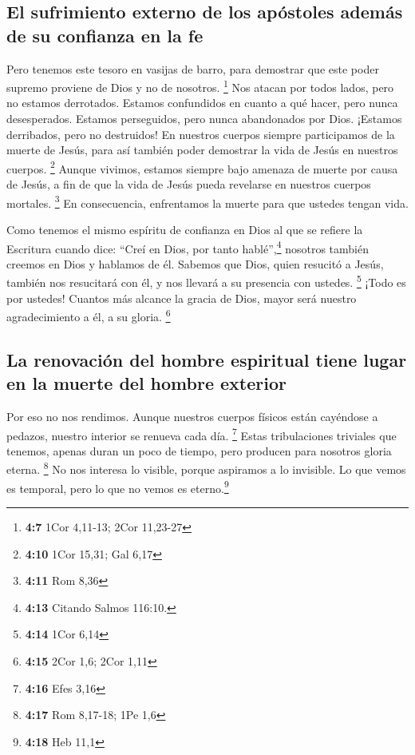 \hypertarget{el-sufrimiento-externo-de-los-apuxf3stoles-ademuxe1s-de-su-confianza-en-la-fe}{%
\subsection{El sufrimiento externo de los apóstoles además de su
confianza en la
fe}\label{el-sufrimiento-externo-de-los-apuxf3stoles-ademuxe1s-de-su-confianza-en-la-fe}}

 Pero tenemos este tesoro en vasijas de barro, para
demostrar que este poder supremo proviene de Dios y no de nosotros.
\footnote{\textbf{4:7} 1Cor 4,11-13; 2Cor 11,23-27}  Nos
atacan por todos lados, pero no estamos derrotados. Estamos confundidos
en cuanto a qué hacer, pero nunca desesperados.  Estamos
perseguidos, pero nunca abandonados por Dios. ¡Estamos derribados, pero
no destruidos!  En nuestros cuerpos siempre participamos
de la muerte de Jesús, para así también poder demostrar la vida de Jesús
en nuestros cuerpos. \footnote{\textbf{4:10} 1Cor 15,31; Gal 6,17}
 Aunque vivimos, estamos siempre bajo amenaza de muerte
por causa de Jesús, a fin de que la vida de Jesús pueda revelarse en
nuestros cuerpos mortales. \footnote{\textbf{4:11} Rom 8,36}
 En consecuencia, enfrentamos la muerte para que ustedes
tengan vida.

 Como tenemos el mismo espíritu de confianza en Dios al
que se refiere la Escritura cuando dice: ``Creí en Dios, por tanto
hablé'',\footnote{\textbf{4:13} Citando Salmos 116:10.} nosotros también
creemos en Dios y hablamos de él.  Sabemos que Dios,
quien resucitó a Jesús, también nos resucitará con él, y nos llevará a
su presencia con ustedes. \footnote{\textbf{4:14} 1Cor 6,14}
 ¡Todo es por ustedes! Cuantos más alcance la gracia de
Dios, mayor será nuestro agradecimiento a él, a su gloria. \footnote{\textbf{4:15}
  2Cor 1,6; 2Cor 1,11}

\hypertarget{la-renovaciuxf3n-del-hombre-espiritual-tiene-lugar-en-la-muerte-del-hombre-exterior}{%
\subsection{La renovación del hombre espiritual tiene lugar en la muerte
del hombre
exterior}\label{la-renovaciuxf3n-del-hombre-espiritual-tiene-lugar-en-la-muerte-del-hombre-exterior}}

 Por eso no nos rendimos. Aunque nuestros cuerpos físicos
están cayéndose a pedazos, nuestro interior se renueva cada día.
\footnote{\textbf{4:16} Efes 3,16}  Estas tribulaciones
triviales que tenemos, apenas duran un poco de tiempo, pero producen
para nosotros gloria eterna. \footnote{\textbf{4:17} Rom 8,17-18; 1Pe
  1,6}  No nos interesa lo visible, porque aspiramos a lo
invisible. Lo que vemos es temporal, pero lo que no vemos es
eterno.\footnote{\textbf{4:18} Heb 11,1}

